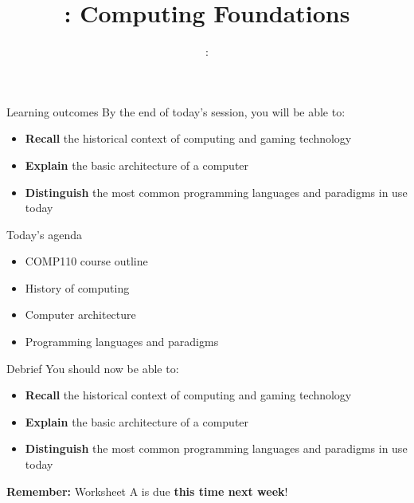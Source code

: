 \usepackage{../../beamerthemeFalmouthGamesAcademy}
\usepackage{multimedia}
\graphicspath{ {../../} }


\usepackage[normalem]{ulem}
\usepackage{wasysym}

\usepackage{pdfpages}

\usetikzlibrary{arrows,automata}




\title{\sessionnumber: Computing Foundations}
\subtitle{\modulecode: \moduletitle}

\frame{\titlepage} 

\begin{frame}{Learning outcomes}
	By the end of today's session, you will be able to:
	\begin{itemize}
		\item \textbf{Recall} the historical context of computing and gaming technology
		\item \textbf{Explain} the basic architecture of a computer
		\item \textbf{Distinguish} the most common programming languages and paradigms in use today
	\end{itemize}
\end{frame}

\begin{frame}{Today's agenda}
	\begin{itemize}
		\item COMP110 course outline
		\item History of computing
		\item Computer architecture
		\item Programming languages and paradigms
	\end{itemize}
\end{frame}









\begin{frame}{Debrief}
	\pause You should now be able to:
	\begin{itemize}
		\item \textbf{Recall} the historical context of computing and gaming technology
		\item \textbf{Explain} the basic architecture of a computer
		\item \textbf{Distinguish} the most common programming languages and paradigms in use today
	\end{itemize}
	\pause \textbf{Remember:} Worksheet A is due \textbf{this time next week}!
\end{frame}


